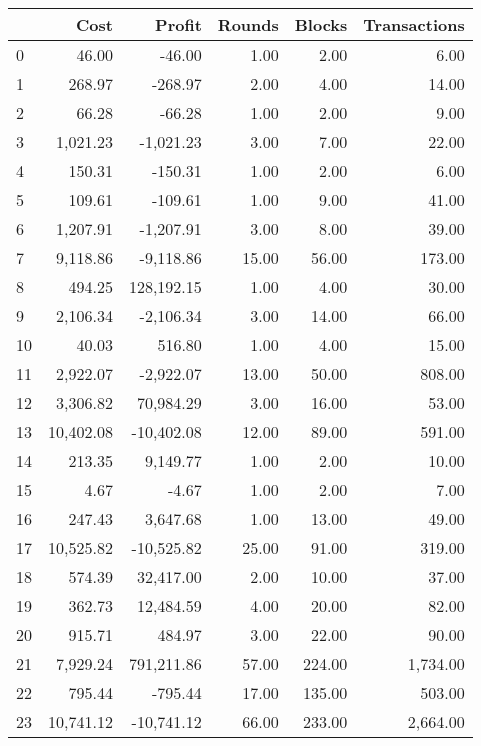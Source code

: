 \begin{tabular}{lrrrrr}
\toprule
{} &      Cost &     Profit & Rounds & Blocks & Transactions \\
\midrule
0  &     46.00 &     -46.00 &   1.00 &   2.00 &         6.00 \\
1  &    268.97 &    -268.97 &   2.00 &   4.00 &        14.00 \\
2  &     66.28 &     -66.28 &   1.00 &   2.00 &         9.00 \\
3  &  1,021.23 &  -1,021.23 &   3.00 &   7.00 &        22.00 \\
4  &    150.31 &    -150.31 &   1.00 &   2.00 &         6.00 \\
5  &    109.61 &    -109.61 &   1.00 &   9.00 &        41.00 \\
6  &  1,207.91 &  -1,207.91 &   3.00 &   8.00 &        39.00 \\
7  &  9,118.86 &  -9,118.86 &  15.00 &  56.00 &       173.00 \\
8  &    494.25 & 128,192.15 &   1.00 &   4.00 &        30.00 \\
9  &  2,106.34 &  -2,106.34 &   3.00 &  14.00 &        66.00 \\
10 &     40.03 &     516.80 &   1.00 &   4.00 &        15.00 \\
11 &  2,922.07 &  -2,922.07 &  13.00 &  50.00 &       808.00 \\
12 &  3,306.82 &  70,984.29 &   3.00 &  16.00 &        53.00 \\
13 & 10,402.08 & -10,402.08 &  12.00 &  89.00 &       591.00 \\
14 &    213.35 &   9,149.77 &   1.00 &   2.00 &        10.00 \\
15 &      4.67 &      -4.67 &   1.00 &   2.00 &         7.00 \\
16 &    247.43 &   3,647.68 &   1.00 &  13.00 &        49.00 \\
17 & 10,525.82 & -10,525.82 &  25.00 &  91.00 &       319.00 \\
18 &    574.39 &  32,417.00 &   2.00 &  10.00 &        37.00 \\
19 &    362.73 &  12,484.59 &   4.00 &  20.00 &        82.00 \\
20 &    915.71 &     484.97 &   3.00 &  22.00 &        90.00 \\
21 &  7,929.24 & 791,211.86 &  57.00 & 224.00 &     1,734.00 \\
22 &    795.44 &    -795.44 &  17.00 & 135.00 &       503.00 \\
23 & 10,741.12 & -10,741.12 &  66.00 & 233.00 &     2,664.00 \\

\end{tabular}
